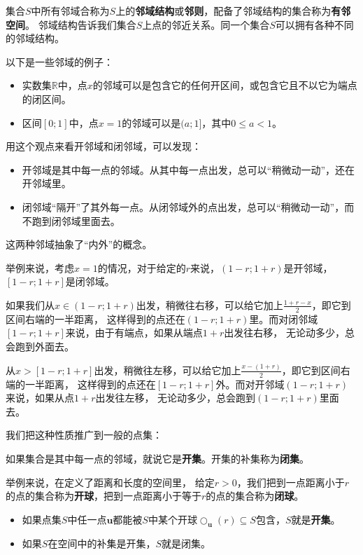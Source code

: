 \documentclass[12pt,UTF8]{ctexbook}
\begin{document}
集合$S$中所有邻域合称为$S$上的\textbf{邻域结构}或\textbf{邻则}，配备了邻域结构的集合称为\textbf{有邻空间}。
邻域结构告诉我们集合$S$上点的邻近关系。同一个集合$S$可以拥有各种不同的邻域结构。

以下是一些邻域的例子：
\begin{itemize}
    \item 实数集$\mathbb{R}$中，点$x$的邻域可以是包含它的任何开区间，或包含它且不以它为端点的闭区间。
    \item 区间$[0;1]$中，点$x=1$的邻域可以是$(a;1]$，其中$0\leqslant a < 1$。
\end{itemize}

用这个观点来看开邻域和闭邻域，可以发现：
\begin{itemize}
    \item 开邻域是其中每一点的邻域。从其中每一点出发，总可以“稍微动一动”，还在开邻域里。
    \item 闭邻域“隔开”了其外每一点。从闭邻域外的点出发，总可以“稍微动一动”，而不跑到闭邻域里面去。
\end{itemize}
这两种邻域抽象了“内外”的概念。

举例来说，考虑$x=1$的情况，对于给定的$r$来说，$(1-r;1+r)$是开邻域，$[1-r;1+r]$是闭邻域。

如果我们从$x\in(1-r;1+r)$出发，稍微往右移，可以给它加上$\frac{1+r-x}{2}$，即它到区间右端的一半距离，
这样得到的点还在$(1-r;1+r)$里。而对闭邻域$[1-r;1+r]$来说，由于有端点，如果从端点$1+r$出发往右移，
无论动多少，总会跑到外面去。

从$x>[1-r;1+r]$出发，稍微往左移，可以给它加上$\frac{x-(1+r)}{2}$，即它到区间右端的一半距离，
这样得到的点还在$[1-r;1+r]$外。而对开邻域$(1-r;1+r)$来说，如果从点$1+r$出发往左移，
无论动多少，总会跑到$(1-r;1+r)$里面去。

我们把这种性质推广到一般的点集：
\begin{df}
    如果集合是其中每一点的邻域，就说它是\textbf{开集}。开集的补集称为\textbf{闭集}。
\end{df}

举例来说，在定义了距离和长度的空间里，
给定$r>0$，我们把到一点距离小于$r$的点的集合称为\textbf{开球}，把到一点距离小于等于$r$的点的集合称为\textbf{闭球}。
\begin{itemize}
    \item 如果点集$S$中任一点$\mathbf{u}$都能被$S$中某个开球$\bigcirc_{\mathbf{u}}(r)\subseteq S$包含，$S$就是\textbf{开集}。
    \item 如果$S$在空间中的补集是开集，$S$就是闭集。
\end{itemize}
\end{document}

